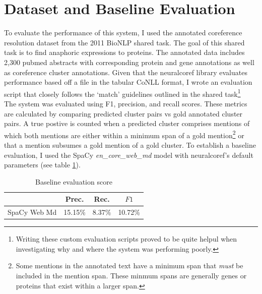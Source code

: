\documentclass[11pt]{article}
\begin{document}
\section{Dataset and Baseline Evaluation}
To evaluate the performance of this system, I used the annotated coreference resolution dataset from the 2011 BioNLP shared task. The goal of this shared task is to find anaphoric expressions to proteins. The annotated data includes 2,300 pubmed abstracts with corresponding protein and gene annotations as well as coreference cluster annotations. Given that the neuralcoref library evaluates performance based off a file in the tabular CoNLL format, I wrote an evaluation script that closely follows the ‘match’ guidelines outlined in the shared task\footnote{Writing these custom evaluation scripts proved to be quite helpul when investigating why and where the system was performing poorly.} \\
The system was evaluated using F1, precision, and recall scores. These metrics are calculated by comparing predicted cluster pairs vs gold annotated cluster pairs. A true postive is counted when a  predicted cluster comprises mentions of which both mentions are either within a minimum span of a gold mention\footnote{Some mentions in the annotated text have a minimum span that \textit{must} be included in the mention span. These minmum spans are generally genes or proteins that exist within a larger span.} or that a mention subsumes a gold mention of a gold cluster. 
To establish a baseline evaluation, I used the SpaCy \textit{en\_core\_web\_md} model with neuralcoref's default parameters (see table \ref{tab:baseline}). \\  
\begin{table}[h]
    \centering
 \begin{tabular}{||c c c c||} 
 \hline
  &  Prec.  & Rec. & $F1$ \\ [0.5ex] 
 \hline\hline
     SpaCy Web Md & 15.15\% & 8.37\% & 10.72\% \\ 
 \hline
\end{tabular}
\caption{Baseline evaluation score}
\label{tab:baseline}
\end{table}
\end{document}
